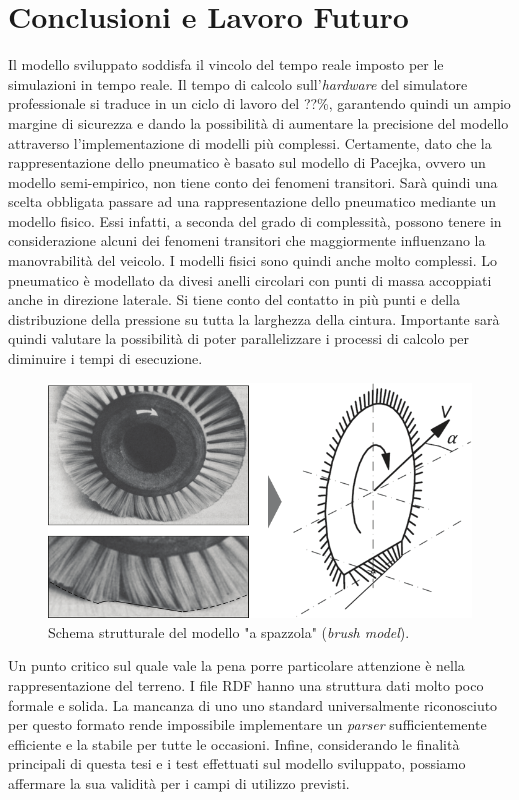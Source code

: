 \chapter{Conclusioni e Lavoro Futuro}
\label{Conclusione}
%
Il modello sviluppato soddisfa il vincolo del tempo reale imposto per le simulazioni in tempo reale. Il tempo di calcolo sull'\textit{hardware} del simulatore professionale si traduce in un ciclo di lavoro del ??\%, garantendo quindi un ampio margine di sicurezza e dando la possibilità di aumentare la precisione del modello attraverso l'implementazione di modelli più complessi. Certamente, dato che la rappresentazione dello pneumatico è basato sul modello di Pacejka, ovvero un modello semi-empirico, non tiene conto dei fenomeni transitori. Sarà quindi una scelta obbligata passare ad una rappresentazione dello pneumatico mediante un modello fisico. Essi infatti, a seconda del grado di complessità, possono tenere in considerazione alcuni dei fenomeni transitori che maggiormente influenzano la manovrabilità del veicolo. I modelli fisici sono quindi anche molto complessi. Lo pneumatico è modellato da divesi anelli circolari con punti di massa accoppiati anche in direzione laterale. Si tiene conto del contatto in più punti e della distribuzione della pressione su tutta la larghezza della cintura. Importante sarà quindi valutare la possibilità di poter parallelizzare i processi di calcolo per diminuire i tempi di esecuzione.

\begin{figure}
	\centering
	\includegraphics[width=0.7\linewidth]{Figures/brush_model}
	\caption{Schema strutturale del modello "a spazzola" (\textit{brush model}). }
	\label{brushmodel}
\end{figure}

Un punto critico sul quale vale la pena porre particolare attenzione è nella rappresentazione del terreno. I file \ac{RDF} hanno una struttura dati molto poco formale e solida. La mancanza di uno uno standard universalmente riconosciuto per questo formato rende impossibile implementare un \textit{parser} sufficientemente efficiente e la stabile per tutte le occasioni.
Infine, considerando le finalità principali di questa tesi e i test effettuati sul modello sviluppato, possiamo affermare la sua validità per i campi di utilizzo previsti.





